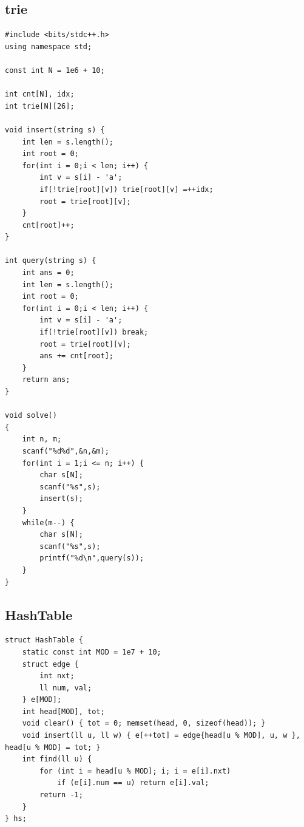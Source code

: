 \documentclass[twoside]{article}
\begin{document}
\subsection{trie}
\begin{lstlisting}
#include <bits/stdc++.h>
using namespace std;

const int N = 1e6 + 10;

int cnt[N], idx;
int trie[N][26];

void insert(string s) {
    int len = s.length();
    int root = 0;
    for(int i = 0;i < len; i++) {
        int v = s[i] - 'a';
        if(!trie[root][v]) trie[root][v] =++idx;
        root = trie[root][v];
    }
    cnt[root]++;
}

int query(string s) {
    int ans = 0;
    int len = s.length();
    int root = 0;
    for(int i = 0;i < len; i++) {
        int v = s[i] - 'a';
        if(!trie[root][v]) break;
        root = trie[root][v];
        ans += cnt[root];
    }
    return ans;
}

void solve()
{
    int n, m;
    scanf("%d%d",&n,&m);
    for(int i = 1;i <= n; i++) {
        char s[N];
        scanf("%s",s);
        insert(s);
    }
    while(m--) {
        char s[N];
        scanf("%s",s);
        printf("%d\n",query(s));
    }
}\end{lstlisting}
\subsection{HashTable}
\begin{lstlisting}
struct HashTable {
    static const int MOD = 1e7 + 10;
    struct edge {
        int nxt;
        ll num, val;
    } e[MOD];
    int head[MOD], tot;
    void clear() { tot = 0; memset(head, 0, sizeof(head)); }
    void insert(ll u, ll w) { e[++tot] = edge{head[u % MOD], u, w }, head[u % MOD] = tot; }
    int find(ll u) {
        for (int i = head[u % MOD]; i; i = e[i].nxt)
            if (e[i].num == u) return e[i].val;
        return -1;
    }
} hs;\end{lstlisting}
\end{document}
